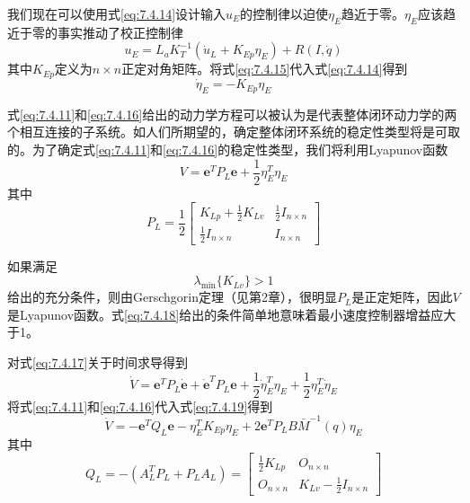 \documentclass[UTF8]{ctexart}
\begin{document}
我们现在可以使用式\eqref{eq:7.4.14}设计输入$u_E$的控制律以迫使$\eta_E$趋近于零。$\eta_E$应该趋近于零的事实推动了校正控制律
\begin{equation}\label{eq:7.4.15}
u_E = L_a K_T^{-1}(\dot{u}_L + K_{Ep}\eta_E) + R(I,\dot{q})
\end{equation}
其中$K_{Ep}$定义为$n \times n$正定对角矩阵。将式\eqref{eq:7.4.15}代入式\eqref{eq:7.4.14}得到
\begin{equation}\label{eq:7.4.16}
\dot{\eta}_E = -K_{Ep}\eta_E
\end{equation}

式\eqref{eq:7.4.11}和\eqref{eq:7.4.16}给出的动力学方程可以被认为是代表整体闭环动力学的两个相互连接的子系统。如人们所期望的，确定整体闭环系统的稳定性类型将是可取的。为了确定式\eqref{eq:7.4.11}和\eqref{eq:7.4.16}的稳定性类型，我们将利用Lyapunov函数
\begin{equation}\label{eq:7.4.17}
V = \mathbf{e}^T P_L \mathbf{e} + \frac{1}{2}\eta_E^T \eta_E
\end{equation}
其中
\begin{equation*}
P_L = \frac{1}{2}\begin{bmatrix} K_{Lp} + \frac{1}{2}K_{Lv} & \frac{1}{2}I_{n \times n} \\ \frac{1}{2}I_{n \times n} & I_{n \times n} \end{bmatrix}
\end{equation*}

如果满足
\begin{equation}\label{eq:7.4.18}
\lambda_{\min}\{K_{Lv}\} > 1
\end{equation}
给出的充分条件，则由Gerschgorin定理（见第2章），很明显$P_L$是正定矩阵，因此$V$是Lyapunov函数。式\eqref{eq:7.4.18}给出的条件简单地意味着最小速度控制器增益应大于1。

对式\eqref{eq:7.4.17}关于时间求导得到
\begin{equation}\label{eq:7.4.19}
\dot{V} = \mathbf{e}^T P_L \dot{\mathbf{e}} + \dot{\mathbf{e}}^T P_L \mathbf{e} + \frac{1}{2}\dot{\eta}_E^T \eta_E + \frac{1}{2}\eta_E^T \dot{\eta}_E
\end{equation}
将式\eqref{eq:7.4.11}和\eqref{eq:7.4.16}代入式\eqref{eq:7.4.19}得到
\begin{equation}\label{eq:7.4.20}
\dot{V} = -\mathbf{e}^T Q_L \mathbf{e} - \eta_E^T K_{Ep}\eta_E + 2\mathbf{e}^T P_L B \bar{M}^{-1}(q)\eta_E
\end{equation}
其中
\begin{equation}\label{eq:7.4.21}
Q_L = -(A_L^T P_L + P_L A_L) = \begin{bmatrix} \frac{1}{2}K_{Lp} & O_{n \times n} \\ O_{n \times n} & K_{Lv} - \frac{1}{2}I_{n \times n} \end{bmatrix}
\end{equation}
\end{document}
